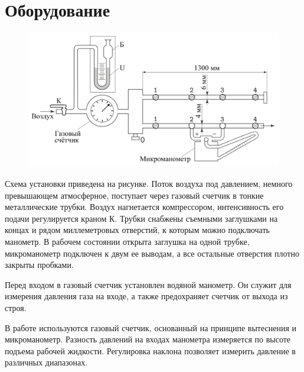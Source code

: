 \section{Оборудование}

\begin{figure}[ht!]
    \centering\includegraphics[width=0.8\linewidth]{img/eq1.png}
\end{figure}

Схема установки приведена на рисунке. Поток воздуха под давлением, немного превышающем
атмосферное, поступает через газовый счетчик в тонкие металлические трубки. 
Воздух нагнетается компрессором, интенсивность его подачи регулируется краном К. Трубки
снабжены съемными заглушками на концах и рядом миллеметровых отверстий, к которым
можно подключать манометр. В рабочем состоянии открыта заглушка на одной трубке,
микроманометр подключен к двум ее выводам, а все остальные отверстия плотно закрыты
пробками.

Перед входом в газовый счетчик установлен водяной манометр. Он служит для измерения
давления газа на входе, а также предохраняет счетчик от выхода из строя.

В работе используются газовый счетчик, основанный на принципе вытеснения и
микроманометр. Разность давлений на входах манометра измеряется по высоте подъема рабочей
жидкости. Регулировка наклона позволяет измерить давление в различных диапазонах.

